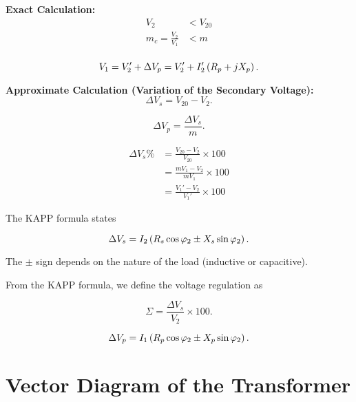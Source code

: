 \documentclass{report}
\begin{document}
\begin{enumerate}
	\ii \textbf{Exact Calculation:}
	\begin{align*}
		V_2                   & < V_{20} \\
		m_c = \frac{V_2}{V_1} & < m      \\
	\end{align*}

	\[
		V_1 = V_2' + \Delta V_p = V_2' + I_2'\left( R_p + j X_p \right)
		.\]

	\ii \textbf{Approximate Calculation (Variation of the Secondary Voltage):}
	\[
		\Delta V_s = V_{20} - V_2
		.\]

	\[
		\Delta V_p = \frac{\Delta V_s}{m}
		.\]

	\begin{align*}
		\Delta V_s \% & = \frac{V_{20} - V_2}{V_{20}} \times 100 \\
		              & = \frac{mV_1 - V_2}{mV_1} \times 100     \\
		              & = \frac{V_1' - V_2}{V_1'} \times 100
	\end{align*}

	The KAPP formula states

	\[
		\Delta V_s = I_2 \left( R_s \cos \varphi_2 \pm X_s \sin \varphi_2 \right)
		.\]

	The $\pm$ sign depends on the nature of the load (inductive or capacitive).

	From the KAPP formula, we define the voltage regulation as

	\[
		\Sigma = \frac{\Delta V_s}{V_2} \times 100
		.\]

	\[
		\Delta V_p = I_1 \left( R_p \cos \varphi_2 \pm X_p \sin \varphi_2 \right)
		.\]
\end{enumerate}

\section{Vector Diagram of the Transformer}
\end{document}
